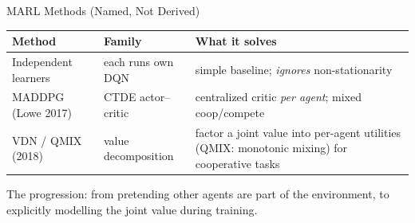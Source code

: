 \begin{frame}{MARL Methods (Named, Not Derived)}
\centering
\renewcommand{\arraystretch}{1.4}
\begin{tabular}{@{}p{3.4cm} p{3.0cm} p{5.0cm}@{}}
\toprule
\textbf{Method} & \textbf{Family} & \textbf{What it solves} \\
\midrule
Independent learners & each runs own DQN & simple baseline; \emph{ignores}
        non-stationarity \\
MADDPG \scriptsize(Lowe 2017) & CTDE actor--critic & centralized critic
        \emph{per agent}; mixed coop/compete \\
VDN / QMIX \scriptsize(2018) & value decomposition & factor a joint value into
        per-agent utilities (QMIX: monotonic mixing) for cooperative tasks \\
\bottomrule
\end{tabular}
\vfill
{\footnotesize The progression: from pretending other agents are part of the
environment, to explicitly modelling the joint value during training.}
\end{frame}

